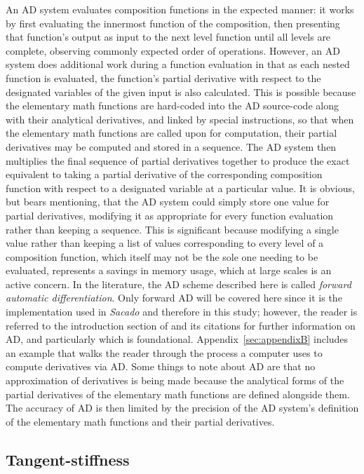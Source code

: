 \documentclass[preprint,12pt]{elsarticle}
\begin{document}
An AD system evaluates composition functions in the expected manner: it works
by first evaluating the innermost function of the composition, then presenting
that function's output as input to the next level function until all levels are
complete, observing commonly expected order of operations. However, an AD
system does additional work during a function evaluation in that as each nested
function is evaluated, the function's partial derivative with respect to the
designated variables of the given input is also calculated.  This is possible
because the elementary math functions are hard-coded into the AD source-code
along with their analytical derivatives, and linked by special instructions, so
that when the elementary math functions are called upon for computation, their
partial derivatives may be computed and stored in a sequence. The AD system
then multiplies the final sequence of partial derivatives together to produce
the exact equivalent to taking a partial derivative of the corresponding
composition function with respect to a designated variable at a particular
value. 
%
It is obvious, but bears mentioning, that the AD system could simply
store one value for partial derivatives, modifying it as appropriate for every
function evaluation rather than keeping a sequence. This is significant because
modifying a single value rather than keeping a list of values corresponding to
every level of a composition function, which itself may not be the sole one
needing to be evaluated, represents a savings in memory usage, which at large
scales is an active concern. In the literature, the AD scheme described here is
called \emph{forward automatic differentiation}. Only forward AD will be
covered here since it is the implementation used in \emph{Sacado} and therefore
in this study; however, the reader is referred to the introduction section of
\cite{ref-AD-methods} and its citations for further information on AD, and
particularly \cite{ref-on-AD} which is foundational.
Appendix~\ref{sec:appendixB} includes an example that walks the reader through
the process a computer uses to compute derivatives via AD.  Some things to note
about AD are that no approximation of derivatives is being made because the
analytical forms of the partial derivatives of the elementary math functions are defined
alongside them. The accuracy of AD is then limited by the precision of the AD
system's definition of the elementary math functions and their partial
derivatives.
 
\subsection{Tangent-stiffness} 
\label{subsec:TS}
\end{document}
